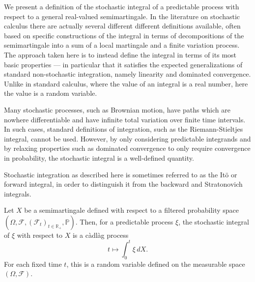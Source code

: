 \documentclass[12pt]{article}
\begin{document}

We present a definition of the stochastic integral of a predictable process with respect to a general real-valued semimartingale.
In the literature on stochastic calculus there are actually several different different definitions available, often based on specific constructions of the integral in terms of decompositions of the semimartingale into a sum of a local martingale and a finite variation process.
The approach taken here is to instead define the integral in terms of its most basic properties --- in particular that it satisfies the expected generalizations of standard non-stochastic integration, namely linearity and dominated convergence. Unlike in standard calculus, where the value of an integral is a real number, here the value is a random variable.

Many stochastic processes, such as Brownian motion, have paths which are nowhere differentiable and have infinite total variation over finite time intervals. In such cases, standard definitions of integration, such as the Riemann-Stieltjes integral, cannot be used. However, by only considering predictable integrands and by relaxing properties such as dominated convergence to only require convergence in probability, the stochastic integral is a well-defined quantity.

Stochastic integration as described here is sometimes referred to as the It\"o or forward integral, in order to distinguish it from the backward and Stratonovich integrals.


Let $X$ be a semimartingale defined with respect to a filtered probability space $(\Omega,\mathcal{F},(\mathcal{F}_t)_{t\in\mathbb{R}_+},\mathbb{P})$.
Then, for a predictable process $\xi$, the stochastic integral of $\xi$ with respect to $X$ is a c\`adl\`ag process
\begin{equation*}
t\mapsto\int_0^t\xi\,dX.
\end{equation*}
For each fixed time $t$, this is a random variable defined on the measurable space $(\Omega,\mathcal{F})$.
\end{document}
